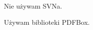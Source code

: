 \documentclass{article}
\begin{document}
Nie używam SVNa.

Używam biblioteki PDFBox.
\end{document}
